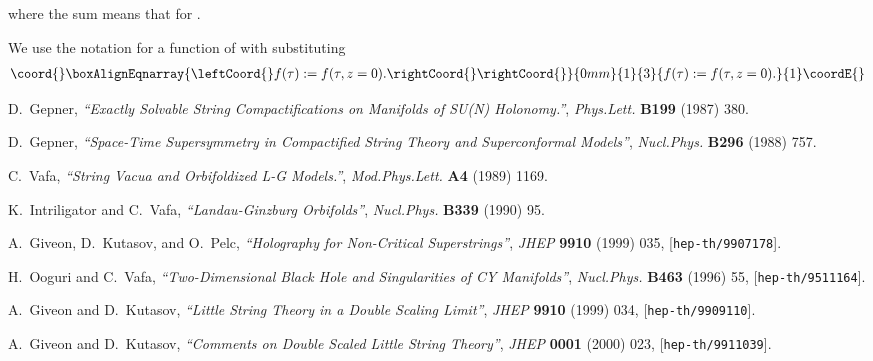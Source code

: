 \documentclass[a4paper,12pt]{article}
\numberwithin{equation}{section}
\begin{document}
where the sum \coordHE{} means that 
 \coordHE{} for \coordHE{}.

We use the notation \coordHE{} for a function \coordHE{}
of \coordHE{} with substituting \coordHE{}
\begin{eqnarray*}\coord{}\boxAlignEqnarray{\leftCoord{}
 f(\tau):=f(\tau,z=0). \rightCoord{}
\rightCoord{}}{0mm}{1}{3}{
 f(\tau):=f(\tau,z=0). 
}{1}\coordE{}\end{eqnarray*}

\newpage
\providecommand{\href}[2]{#2}\begingroup\raggedright\begin{thebibliography}{10}

D.~Gepner, {\it ``{Exactly Solvable String Compactifications on Manifolds of
  SU(N) Holonomy.}''},  {\em Phys.Lett.} {\bf B199} (1987) 380.

D.~Gepner, {\it ``{Space-Time Supersymmetry in Compactified String Theory and
  Superconformal Models}''},  {\em Nucl.Phys.} {\bf B296} (1988) 757.

C.~Vafa, {\it ``{String Vacua and Orbifoldized L-G Models.}''},  {\em
  Mod.Phys.Lett.} {\bf A4} (1989) 1169.

K.~Intriligator and C.~Vafa, {\it ``{Landau-Ginzburg Orbifolds}''},  {\em
  Nucl.Phys.} {\bf B339} (1990) 95.

A.~Giveon, D.~Kutasov, and O.~Pelc, {\it ``{Holography for Non-Critical
  Superstrings}''},  {\em JHEP} {\bf 9910} (1999) 035,
  [\href{http://xxx.lanl.gov/abs/hep-th/9907178}{{\tt hep-th/9907178}}].

H.~Ooguri and C.~Vafa, {\it ``{Two-Dimensional Black Hole and Singularities of
  CY Manifolds}''},  {\em Nucl.Phys.} {\bf B463} (1996) 55,
  [\href{http://xxx.lanl.gov/abs/hep-th/9511164}{{\tt hep-th/9511164}}].

A.~Giveon and D.~Kutasov, {\it ``{Little String Theory in a Double Scaling
  Limit}''},  {\em JHEP} {\bf 9910} (1999) 034,
  [\href{http://xxx.lanl.gov/abs/hep-th/9909110}{{\tt hep-th/9909110}}].

A.~Giveon and D.~Kutasov, {\it ``{Comments on Double Scaled Little String
  Theory}''},  {\em JHEP} {\bf 0001} (2000) 023,
  [\href{http://xxx.lanl.gov/abs/hep-th/9911039}{{\tt hep-th/9911039}}].


\end{thebibliography}
\end{document}
